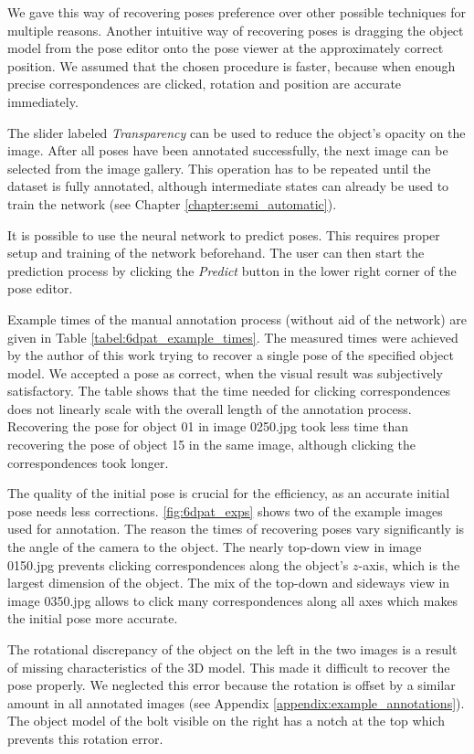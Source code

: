 We gave this way of recovering poses preference over other possible techniques for multiple reasons. Another intuitive way of recovering poses is dragging the object model from the pose editor onto the pose viewer at the approximately correct position. We assumed that the chosen procedure is faster, because when enough precise correspondences are clicked, rotation and position are accurate immediately. 

The slider labeled \textit{Transparency} can be used to reduce the object's opacity on the image. After all poses have been annotated successfully, the next image can be selected from the image gallery. This operation has to be repeated until the dataset is fully annotated, although intermediate states can already be used to train the network (see Chapter \ref{chapter:semi_automatic}).

It is possible to use the neural network to predict poses. This requires proper setup and training of the network beforehand. The user can then start the prediction process by clicking the \textit{Predict} button in the lower right corner of the pose editor.

Example times of the manual annotation process (without aid of the network) are given in Table \ref{tabel:6dpat_example_times}. The measured times were achieved by the author of this work trying to recover a single pose of the specified object model. We accepted a pose as correct, when the visual result was subjectively satisfactory. The table shows that the time needed for clicking correspondences does not linearly scale with the overall length of the annotation process. Recovering the pose for object 01 in image 0250.jpg took less time than recovering the pose of object 15 in the same image, although clicking the correspondences took longer. 

The quality of the initial pose is crucial for the efficiency, as an accurate initial pose needs less corrections. \fig \ref{fig:6dpat_exps} shows two of the example images used for annotation. The reason the times of recovering poses vary significantly is the angle of the camera to the object. The nearly top-down view in image 0150.jpg prevents clicking correspondences along the object's $z$-axis, which is the largest dimension of the object. The mix of the top-down and sideways view in image 0350.jpg allows to click many correspondences along all axes which makes the initial pose more accurate. 

The rotational discrepancy of the object on the left in the two images is a result of missing characteristics of the 3D model. This made it difficult to recover the pose properly. We neglected this error because the rotation is offset by a similar amount in all annotated images (see Appendix \ref{appendix:example_annotations}). The object model of the bolt visible on the right has a notch at the top which prevents this rotation error.

